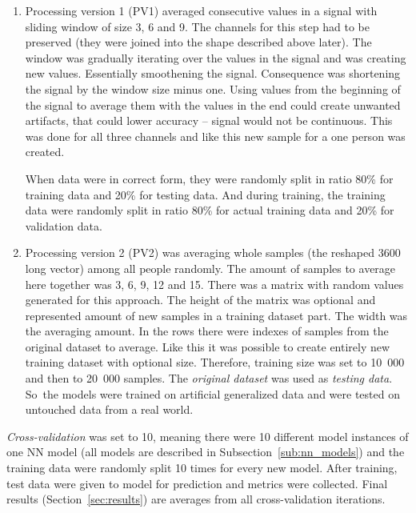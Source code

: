 \begin{enumerate}
	\item Processing version 1 (PV1) averaged consecutive values in a signal with sliding window of size 3, 6 and 9. The channels for this step had to be preserved (they were joined into the shape described above later). The window was gradually iterating over the values in the signal and was creating new values. Essentially smoothening the signal. Consequence was shortening the signal by the window size minus one. Using values from the beginning of the signal to average them with the values in the end could create unwanted artifacts, that could lower accuracy -- signal would not be continuous. This was done for all three channels and like this new sample for a one person was created.

		When data were in correct form, they were randomly split in ratio 80\% for training data and 20\% for testing data. And during training, the training data were randomly split in ratio 80\% for actual training data and 20\% for validation data.

	\item Processing version 2 (PV2) was averaging whole samples (the reshaped 3600 long vector) among all people randomly. The amount of samples to average here together was 3, 6, 9, 12 and 15. There was a matrix with random values generated for this approach. The height of the matrix was optional and represented amount of new samples in a training dataset part. The width was the averaging amount. In the rows there were indexes of samples from the original dataset to average. Like this it was possible to create entirely new training dataset with optional size. Therefore, training size was set to 10~000 and then to 20~000 samples. The \textit{original dataset} was used as \textit{testing data}. So~the models were trained on artificial generalized data and were tested on untouched data from a real world.
\end{enumerate}

\textit{Cross-validation} was set to 10, meaning there were 10 different model instances of one NN model (all models are described in Subsection~\ref{sub:nn_models}) and the training data were randomly split 10 times for every new model. After training, test data were given to model for prediction and metrics were collected. Final results (Section~\ref{sec:results}) are averages from all cross-validation iterations.

